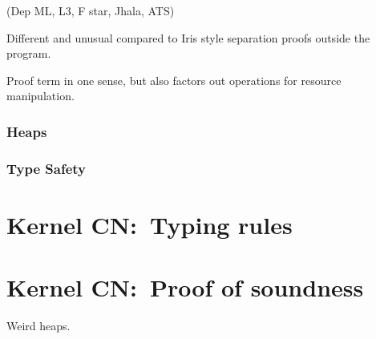 (Dep ML, L3, F star, Jhala, ATS)

Different and unusual compared to Iris style \textemdash{} separation proofs outside the program.

Proof term in one sense, but also factors out operations for resource manipulation.

\subsection{Heaps}


\subsection{Type Safety}

\chapter{Kernel CN:\ Typing rules}%

\chapter{Kernel CN:\ Proof of soundness}%
\label{chap:kernel-soundness}

Weird heaps.
